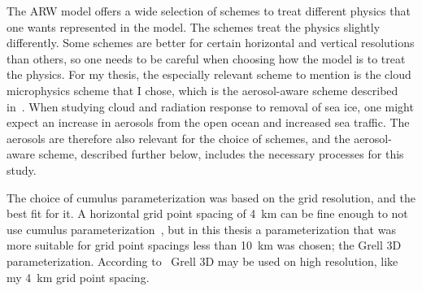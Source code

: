 The ARW model offers a wide selection of schemes to treat different physics that one wants represented in the model. The schemes treat the physics slightly differently. Some schemes are better for certain horizontal and vertical resolutions than others, so one needs to be careful when choosing how the model is to treat the physics. For my thesis, the especially relevant scheme to mention is the cloud microphysics scheme that I chose, which is the aerosol-aware scheme described in~\citet{Thompson2014}. When studying cloud and radiation response to removal of sea ice, one might expect an increase in aerosols from the open ocean and increased sea traffic. The aerosols are therefore also relevant for the choice of schemes, and the aerosol-aware scheme, described further below, includes the necessary processes for this study.

The choice of cumulus parameterization was based on the grid resolution, and the best fit for it. A horizontal grid point spacing of 4~km can be fine enough to not use cumulus parameterization~\citep{Thompson2014}, but in this thesis a parameterization that was more suitable for grid point spacings less than 10~km was chosen; the Grell 3D parameterization. According to~\citet{Wang2015} Grell 3D may be used on high resolution, like my 4~km grid point spacing.

